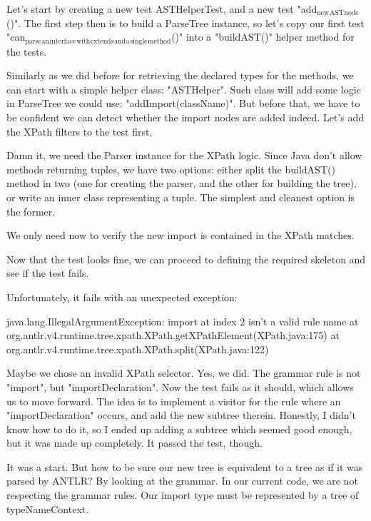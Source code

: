 \documentclass[11pt]{article}
\begin{document}
Let's start by creating a new test ASTHelperTest, and a new test "add$_{\text{new}}$$_{\text{AST}}$$_{\text{node}}$()". The first step then is to
build a ParseTree instance, so let's copy our first test "can$_{\text{parse}}$$_{\text{an}}$$_{\text{interface}}$$_{\text{with}}$$_{\text{extends}}$$_{\text{and}}$$_{\text{a}}$$_{\text{single}}$$_{\text{method}}$()" into 
a "buildAST()" helper method for the tests.


Similarly as we did before for retrieving the declared types for the methods, we can start with a simple helper class: "ASTHelper".
Such class will add some logic in ParseTree we could use: "addImport(className)". But before that, we have to be confident
we can detect whether the import nodes are added indeed. Let's add the XPath filters to the test first.

Damn it, we need the Parser instance for the XPath logic. Since Java don't allow methods returning tuples, we have two options: either split
the buildAST() method in two (one for creating the parser, and the other for building the tree), or write an inner class representing a tuple.
The simplest and cleanest option is the former.


We only need now to verify the new import is contained in the XPath matches.


Now that the test looks fine, we can proceed to defining the required skeleton and see if the test fails.


Unfortunately, it fails with an unexpected exception:

java.lang.IllegalArgumentException: import at index 2 isn't a valid rule name
    at org.antlr.v4.runtime.tree.xpath.XPath.getXPathElement(XPath.java:175)
    at org.antlr.v4.runtime.tree.xpath.XPath.split(XPath.java:122)

Maybe we chose an invalid XPath selector. Yes, we did. The grammar rule is not "import", but "importDeclaration".
Now the test fails as it should, which allows us to move forward. The idea is to implement a visitor for the rule where
an "importDeclaration" occurs, and add the new subtree therein. Honestly, I didn't know how to do it, so I ended up
adding a subtree which seemed good enough, but it was made up completely. It passed the test, though.


It was a start. But how to be sure our new tree is equivalent to a tree as if it was parsed by ANTLR? By looking at the grammar.
In our current code, we are not respecting the grammar rules. Our import type must be represented by a tree of typeNameContext.
\end{document}
